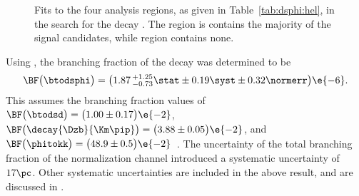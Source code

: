 \begin{figure}
  \begin{center}
    \caption[Fits to \btodsphi data]
    {\small
      Fits to the four analysis regions, as given in Table~\ref{tab:dsphi:hel}, in the search for
      the decay \btodsphi.
      The region \rA is contains the majority of the signal candidates, while region \rD contains
      none.
    }
    \label{fig:dsphi:fits}
  \end{center}
\end{figure}

Using , the branching fraction of the decay \btodsphi was determined to be
\begin{equation}
  \BF\big(\btodsphi\big) =
  \big(1.87\,^{+1.25}_{-0.73}\stat\pm0.19\syst\pm0.32\normerr\big)\e{-6}.
  \label{eq:dsphi:result}
\end{equation}
This assumes the branching fraction values of
$\BF\big(\btodsd\big)=\big(1.00\pm0.17\big)\e{-2}$,
$\BF\big(\decay{\Dzb}{\Km\pip}\big)=\big(3.88\pm0.05\big)\e{-2}$, and
$\BF\big(\phitokk\big)=\big(48.9\pm0.5\big)\e{-2}$~\cite{PDG2012}.
The uncertainty of the total branching fraction of the normalization channel introduced a systematic
uncertainty of $17\pc$.
Other systematic uncertainties are included in the above result, and are discussed in
.






